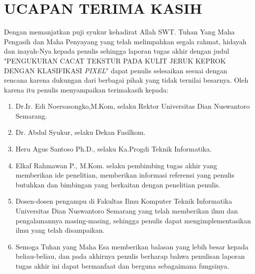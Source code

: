 \documentclass[laporan.tex]{subfiles}
\begin{document}
\chapter*{UCAPAN TERIMA KASIH}

Dengan memanjatkan puji syukur kehadirat Allah SWT. Tuhan Yang Maha Pengasih dan Maha Penyayang yang telah melimpahkan segala rahmat, hidayah dan inayah-Nya kepada penulis sehingga laporan tugas akhir dengan judul "PENGUKURAN CACAT TEKSTUR PADA KULIT JERUK KEPROK DENGAN KLASIFIKASI \emph{PIXEL}" dapat penulis selesaikan sesuai dengan rencana karena dukungan dari berbagai pihak yang tidak ternilai besarnya. Oleh karena itu penulis menyampaikan terimakasih kepada:
\begin{enumerate}
\item Dr.Ir. Edi Noersasongko,M.Kom, selaku Rektor Universitas Dian Nuswantoro Semarang.
\item Dr. Abdul Syukur, selaku Dekan Fasilkom.
\item Heru Agus Santoso Ph.D., selaku Ka.Progdi Teknik Informatika.
\item Elkaf Rahmawan P., M.Kom. selaku pembimbing tugas akhir yang memberikan ide penelitian, memberikan informasi referensi yang penulis butuhkan dan bimbingan yang berkaitan dengan penelitian penulis.
\item Dosen-dosen pengampu di Fakultas Ilmu Komputer Teknik Informatika Universitas Dian Nuswantoro Semarang yang telah memberikan ilmu dan pengalamannya masing-masing, sehingga penulis dapat mengimplementasikan ilmu yang telah disampaikan.
\item Semoga Tuhan yang Maha Esa memberikan balasan yang lebih besar kepada beliau-beliau, dan pada akhirnya penulis berharap bahwa penulisan laporan tugas akhir ini dapat bermanfaat dan berguna sebagaimana fungsinya.
\end{enumerate}
\end{document}
